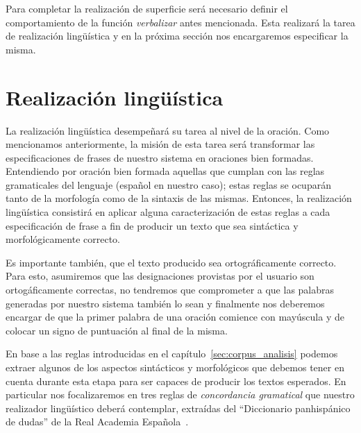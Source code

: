 Para completar la realización de superficie será necesario definir el comportamiento de la función \emph{verbalizar} antes mencionada. Esta realizará la tarea de realización lingüística y en la próxima sección nos encargaremos especificar la misma.





\section{Realización lingüística}
\label{cap:linguistic_realization}

La realización lingüística desempeñará su tarea al nivel de la oración. Como mencionamos anteriormente, la misión de esta tarea será transformar las especificaciones de frases de nuestro sistema en oraciones bien formadas. Entendiendo por oración bien formada aquellas que cumplan con las reglas gramaticales del lenguaje (español en nuestro caso); estas reglas se ocuparán tanto de la morfología como de la sintaxis de las mismas. Entonces, la realización lingüística consistirá en aplicar alguna caracterización de estas reglas a cada especificación de frase a fin de producir un texto que sea sintáctica y morfológicamente correcto.

Es importante también, que el texto producido sea ortográficamente correcto. Para esto, asumiremos que las designaciones provistas por el usuario son ortogáficamente correctas, no tendremos que comprometer a que las palabras generadas por nuestro sistema también lo sean y finalmente nos deberemos encargar de que la primer palabra de una oración comience con mayúscula y de colocar un signo de puntuación al final de la misma.

En base a las reglas introducidas en el capítulo~\ref{sec:corpus_analisis} podemos extraer algunos de los aspectos sintácticos y morfológicos que debemos tener en cuenta durante esta etapa para ser capaces de producir los textos esperados. En particular nos focalizaremos en tres reglas de \emph{concordancia gramatical} que nuestro realizador lingüístico deberá contemplar, extraídas del ``Diccionario panhispánico de dudas'' de la Real Academia Española~\cite{???}.

